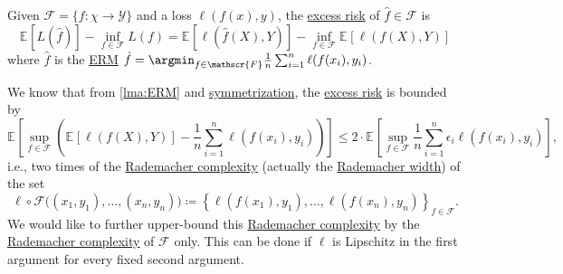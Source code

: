 
\begin{prev}
	Given \(\mathscr{F} = \{ f\colon \chi \to \mathscr{Y} \} \) and a loss \(\ell (f(x), y)\), the \hyperref[not:excess-risk]{excess risk} of \(\hat{f} \in \mathscr{F} \) is
	\[
		\mathbb{E}_{}[L(\hat{f} ) ] - \inf _{f\in \mathscr{F} } L(f)
		= \mathbb{E}_{}[\ell (\hat{f} (X), Y) ] - \inf _{f\in \mathscr{F} } \mathbb{E}_{}\left[\ell (f(X), Y) \right]
	\]
	where \(\hat{f} \) is the \hyperref[prb:ERM]{ERM} \(\hat{f} = \argmin_{f\in \mathscr{F} } \frac{1}{n} \sum_{i=1}^{n} \ell (f(x_i), y_i)\).
\end{prev}

We know that from \autoref{lma:ERM} and \hyperref[lma:symmetrization]{symmetrization}, the \hyperref[not:excess-risk]{excess risk} is bounded by
\[
	\mathbb{E}_{}\left[\sup _{f\in \mathscr{F} } \left( \mathbb{E}_{}\left[\ell (f(X), Y) \right] - \frac{1}{n} \sum_{i=1}^{n} \ell (f(x_i), y_i) \right) \right]
	\leq 2 \cdot \mathbb{E}_{}\left[\sup _{f\in \mathscr{F} } \frac{1}{n} \sum_{i=1}^{n} \epsilon _i \ell (f(x_i), y_i) \right] ,
\]
i.e., two times of the \hyperref[def:Rademacher-complexity]{Rademacher complexity} (actually the \hyperref[def:Rademacher-width]{Rademacher width}) of the set
\[
	\ell \circ \mathscr{F} \big( (x_1, y_1), \dots , (x_n, y_n) \big)
	\coloneqq \left\{ \ell (f(x_1), y_1), \dots , \ell (f(x_n), y_n) \right\} _{f\in \mathscr{F} }.
\]
We would like to further upper-bound this \hyperref[def:Rademacher-complexity]{Rademacher complexity} by the \hyperref[def:Rademacher-complexity]{Rademacher complexity} of \(\mathscr{F} \) only. This can be done if \(\ell \) is Lipschitz in the first argument for every fixed second argument.

